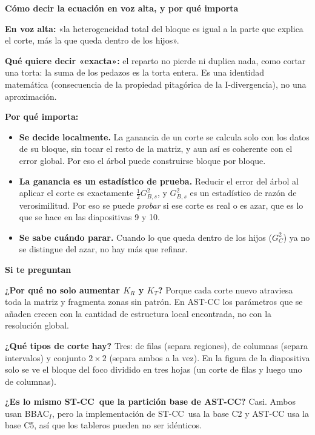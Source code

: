 \documentclass[11pt,a4paper]{article}
\newcommand{\cajainicio}[3]{\par\medskip\noindent
  \begin{lrbox}{\cajabox}\begin{minipage}{\dimexpr\linewidth-2\fboxsep-2\fboxrule\relax}%
  \textbf{\color{#1}#3}\par\smallskip}
\newcommand{\cajafin}[2]{\end{minipage}\end{lrbox}\fcolorbox{#1}{#2}{\usebox{\cajabox}}\par\medskip}
\newenvironment{nota}[1]{\cajainicio{acc}{acc!7}{#1}}{\cajafin{acc}{acc!7}}
\newcommand{\STCC}{ST-CC}
\newcommand{\BBAC}{BBAC$_I$}
\begin{document}
\begin{nota}{Cómo decir la ecuación en voz alta, y por qué importa}
\textbf{En voz alta:} «la heterogeneidad total del bloque es igual a la parte que explica el corte, más la que queda dentro de los hijos».

\textbf{Qué quiere decir «exacta»:} el reparto no pierde ni duplica nada, como cortar una torta: la suma de los pedazos es la torta entera. Es una identidad matemática (consecuencia de la propiedad pitagórica de la I-divergencia), no una aproximación.

\textbf{Por qué importa:}
\begin{itemize}
\item \textbf{Se decide localmente.} La ganancia de un corte se calcula solo con los datos de su bloque, sin tocar el resto de la matriz, y aun así es coherente con el error global. Por eso el árbol puede construirse bloque por bloque.
\item \textbf{La ganancia es un estadístico de prueba.} Reducir el error del árbol al aplicar el corte es exactamente $\tfrac12 G^2_{B,s}$, y $G^2_{B,s}$ es un estadístico de razón de verosimilitud. Por eso se puede \emph{probar} si ese corte es real o es azar, que es lo que se hace en las diapositivas 9 y 10.
\item \textbf{Se sabe cuándo parar.} Cuando lo que queda dentro de los hijos ($G^2_C$) ya no se distingue del azar, no hay más que refinar.
\end{itemize}
\end{nota}

\begin{nota}{Si te preguntan}
\textbf{¿Por qué no solo aumentar $K_R$ y $K_T$?} Porque cada corte nuevo atraviesa toda la matriz y fragmenta zonas sin patrón. En AST-CC los parámetros que se añaden crecen con la cantidad de estructura local encontrada, no con la resolución global.

\textbf{¿Qué tipos de corte hay?} Tres: de filas (separa regiones), de columnas (separa intervalos) y conjunto $2\times2$ (separa ambos a la vez). En la figura de la diapositiva solo se ve el bloque del foco dividido en tres hojas (un corte de filas y luego uno de columnas).

\textbf{¿Es lo mismo \STCC\ que la partición base de AST-CC?} Casi. Ambos usan \BBAC, pero la implementación de \STCC\ usa la base C2 y AST-CC usa la base C5, así que los tableros pueden no ser idénticos.
\end{nota}

\newpage
\end{document}
